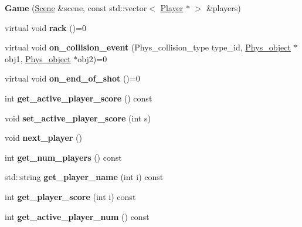 \begin{DoxyCompactItemize}
\item 
\hypertarget{class_game_a5a1c56e74aed4bcf895fa8fb86b2b3df}{
{\bfseries Game} (\hyperlink{class_scene}{Scene} \&scene, const std::vector$<$ \hyperlink{class_player}{Player} $\ast$ $>$ \&players)}
\label{class_game_a5a1c56e74aed4bcf895fa8fb86b2b3df}

\item 
\hypertarget{class_game_a3490c5387127e97258d88b06217237f3}{
virtual void {\bfseries rack} ()=0}
\label{class_game_a3490c5387127e97258d88b06217237f3}

\item 
\hypertarget{class_game_a54654f9fa83a22467ad3523374e15578}{
virtual void {\bfseries on\_\-collision\_\-event} (Phys\_\-collision\_\-type type\_\-id, \hyperlink{class_phys__object}{Phys\_\-object} $\ast$obj1, \hyperlink{class_phys__object}{Phys\_\-object} $\ast$obj2)=0}
\label{class_game_a54654f9fa83a22467ad3523374e15578}

\item 
\hypertarget{class_game_a7da95ca93d3c6b03a3b1c3921137200d}{
virtual void {\bfseries on\_\-end\_\-of\_\-shot} ()=0}
\label{class_game_a7da95ca93d3c6b03a3b1c3921137200d}

\item 
\hypertarget{class_game_a68be5d846071a80fa5e1f769b514a9df}{
int {\bfseries get\_\-active\_\-player\_\-score} () const }
\label{class_game_a68be5d846071a80fa5e1f769b514a9df}

\item 
\hypertarget{class_game_a776ac8259206411ffb6378c3823bd8f9}{
void {\bfseries set\_\-active\_\-player\_\-score} (int s)}
\label{class_game_a776ac8259206411ffb6378c3823bd8f9}

\item 
\hypertarget{class_game_a700ee8b30a3cd3ca4d1027ce64d5614a}{
void {\bfseries next\_\-player} ()}
\label{class_game_a700ee8b30a3cd3ca4d1027ce64d5614a}

\item 
\hypertarget{class_game_a56c0aaedc611682021175c1d513668b6}{
int {\bfseries get\_\-num\_\-players} () const }
\label{class_game_a56c0aaedc611682021175c1d513668b6}

\item 
\hypertarget{class_game_a0fe34b8a3e66284e3dee9a86ecf507ac}{
std::string {\bfseries get\_\-player\_\-name} (int i) const }
\label{class_game_a0fe34b8a3e66284e3dee9a86ecf507ac}

\item 
\hypertarget{class_game_a569afa1ac3539203e19f74bfb74ad5a1}{
int {\bfseries get\_\-player\_\-score} (int i) const }
\label{class_game_a569afa1ac3539203e19f74bfb74ad5a1}

\item 
\hypertarget{class_game_a48d9782639510f0aef29a17448a437b4}{
int {\bfseries get\_\-active\_\-player\_\-num} () const }
\label{class_game_a48d9782639510f0aef29a17448a437b4}

\end{DoxyCompactItemize}
